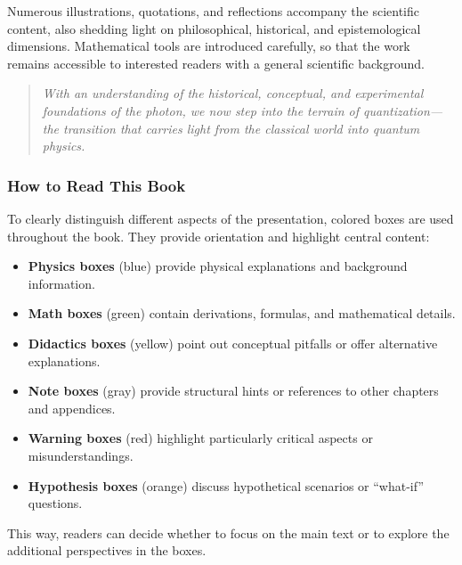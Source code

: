 Numerous illustrations, quotations, and reflections accompany the scientific content, also shedding light on philosophical, historical, and epistemological dimensions. Mathematical tools are introduced carefully, so that the work remains accessible to interested readers with a general scientific background.

\begin{quote}
	\textit{With an understanding of the historical, conceptual, and experimental foundations of the photon, we now step into the terrain of quantization—the transition that carries light from the classical world into quantum physics.}
\end{quote}

\subsubsection*{How to Read This Book}
To clearly distinguish different aspects of the presentation, colored boxes are used throughout the book. They provide orientation and highlight central content:

\begin{itemize}
	\item \textbf{Physics boxes} (blue) provide physical explanations and background information.
	\item \textbf{Math boxes} (green) contain derivations, formulas, and mathematical details.
	\item \textbf{Didactics boxes} (yellow) point out conceptual pitfalls or offer alternative explanations.
	\item \textbf{Note boxes} (gray) provide structural hints or references to other chapters and appendices.
	\item \textbf{Warning boxes} (red) highlight particularly critical aspects or misunderstandings.
	\item \textbf{Hypothesis boxes} (orange) discuss hypothetical scenarios or “what-if” questions.
\end{itemize}

This way, readers can decide whether to focus on the main text or to explore the additional perspectives in the boxes.
